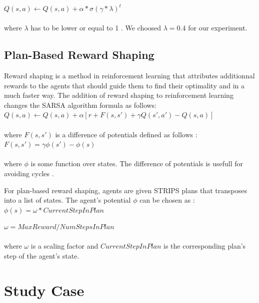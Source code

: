 \documentclass[letterpaper]{article}
\begin{document}
$Q(s, a) \leftarrow  Q(s, a) +  \alpha *  \sigma (\gamma * \lambda)^t$\\\\
where $\lambda$ has to be lower or equal to 1 \citep{etrace}. We choosed  $\lambda = 0.4$ for our experiment.

\subsection{Plan-Based Reward Shaping}

Reward shaping is a method in reinforcement learning that attributes additionnal rewards to the agents that should guide them to find their optimality and in a much faster way.
The addition of reward shaping to reinforcement learning changes the SARSA algorithm formula as follows: \\

$Q(s, a) \leftarrow  Q(s, a) +  \alpha [r + F(s, s') + \gamma Q(s', a') - Q(s,a)]$\\\\
where $ F(s, s')$  is a difference of potentials defined as follows : \\

$F(s, s') =\gamma \phi (s') - \phi (s)$\\\\
where $\phi$ is some function over states. The difference of potentials is usefull for avoiding cycles  \citep{rs2}.

For plan-based reward shaping, agents are given STRIPS plans that transposes into a list of states. The agent's potential $\phi$ can be chosen as :\\

$\phi (s) = \omega * CurrentStepInPlan$

$\omega = MaxReward/NumStepsInPlan$\\\\
where $\omega$ is a scaling factor and $CurrentStepInPlan$ is the corresponding plan's step of the agent's state.

\section{Study Case}
\end{document}
